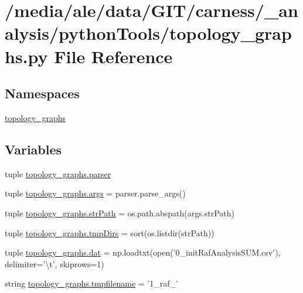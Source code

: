 \hypertarget{a00065}{\section{/media/ale/data/\-G\-I\-T/carness/\-\_\-analysis/python\-Tools/topology\-\_\-graphs.py File Reference}
\label{a00065}
}
\subsection*{Namespaces}
\begin{DoxyCompactItemize}
\item 
\hyperlink{a00129}{topology\-\_\-graphs}
\end{DoxyCompactItemize}
\subsection*{Variables}
\begin{DoxyCompactItemize}
\item 
tuple \hyperlink{a00129_ae8f5442ee1adf5cb74402ea355fa8624}{topology\-\_\-graphs.\-parser}
\item 
tuple \hyperlink{a00129_a24c8c694ace179f28bd0178c8a98cc1f}{topology\-\_\-graphs.\-args} = parser.\-parse\-\_\-args()
\item 
tuple \hyperlink{a00129_a700aee16b39b4ad2a88c4ad9b2595a7c}{topology\-\_\-graphs.\-str\-Path} = os.\-path.\-abspath(args.\-str\-Path)
\item 
tuple \hyperlink{a00129_a8eb5b4fb2ce4eb5e86f9fa6b5ba89ce8}{topology\-\_\-graphs.\-tmp\-Dirs} = sort(os.\-listdir(str\-Path))
\item 
tuple \hyperlink{a00129_a0bffd0371cf5a2357be1b52798816c2c}{topology\-\_\-graphs.\-dat} = np.\-loadtxt(open('0\-\_\-init\-Raf\-Analysis\-S\-U\-M.\-csv'), delimiter='\textbackslash{}t', skiprows=1)
\item 
string \hyperlink{a00129_a7c33855a7bcf13e566f1b8026065fa90}{topology\-\_\-graphs.\-tmpfilename} = '1\-\_\-raf\-\_\-'
\end{DoxyCompactItemize}
